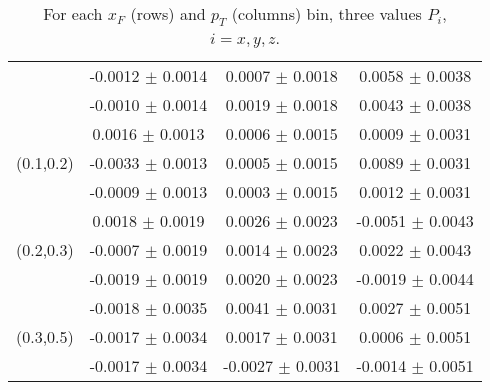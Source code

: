 \begin{table}[]
\begin{tabular}{|c|c|c|c|}
& -0.0012 $\pm$ 0.0014 & 0.0007 $\pm$ 0.0018 & 0.0058 $\pm$ 0.0038  \\
& -0.0010 $\pm$ 0.0014 & 0.0019 $\pm$ 0.0018 & 0.0043 $\pm$ 0.0038  \\ \hline
\multirow{3}{*}{(0.1,0.2)}& 0.0016 $\pm$ 0.0013 & 0.0006 $\pm$ 0.0015 & 0.0009 $\pm$ 0.0031  \\
& -0.0033 $\pm$ 0.0013 & 0.0005 $\pm$ 0.0015 & 0.0089 $\pm$ 0.0031  \\
& -0.0009 $\pm$ 0.0013 & 0.0003 $\pm$ 0.0015 & 0.0012 $\pm$ 0.0031  \\ \hline
\multirow{3}{*}{(0.2,0.3)}& 0.0018 $\pm$ 0.0019 & 0.0026 $\pm$ 0.0023 & -0.0051 $\pm$ 0.0043  \\
& -0.0007 $\pm$ 0.0019 & 0.0014 $\pm$ 0.0023 & 0.0022 $\pm$ 0.0043  \\
& -0.0019 $\pm$ 0.0019 & 0.0020 $\pm$ 0.0023 & -0.0019 $\pm$ 0.0044  \\ \hline
\multirow{3}{*}{(0.3,0.5)}& -0.0018 $\pm$ 0.0035 & 0.0041 $\pm$ 0.0031 & 0.0027 $\pm$ 0.0051  \\
& -0.0017 $\pm$ 0.0034 & 0.0017 $\pm$ 0.0031 & 0.0006 $\pm$ 0.0051  \\
& -0.0017 $\pm$ 0.0034 & -0.0027 $\pm$ 0.0031 & -0.0014 $\pm$ 0.0051  \\ \hline
\end{tabular}
\caption{For each $x_{F}$ (rows) and $p_{T}$ (columns) bin, three values $P_{i}$, $i=x,y,z$. }
\end{table}

